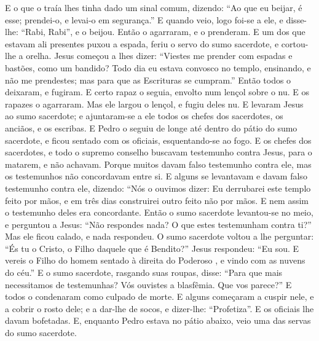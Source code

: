 {  E o que o traía lhes tinha dado um sinal comum, dizendo: “Ao que eu beijar, é esse; prendei-o, e levai-o em segurança.”
  E quando veio, logo foi-se a ele, e disse-lhe: “Rabi, Rabi”, e o beijou.
  Então o agarraram,
 e o prenderam.
  E um dos que estavam ali presentes puxou a espada, feriu o servo do sumo sacerdote, e cortou-lhe a orelha.
  Jesus começou a lhes dizer: “Viestes me prender com espadas e bastões, como
{} um bandido?
  Todo dia eu estava convosco no templo, ensinando, e não me prendestes; mas
{} para que as Escrituras se cumpram.”
  Então todos o deixaram, e fugiram.
  E certo rapaz o seguia, envolto num lençol sobre o
{} nu. E os rapazes o agarraram.
  Mas ele largou o lençol, e fugiu deles nu.
  E levaram Jesus ao sumo sacerdote; e ajuntaram-se a ele todos os chefes dos sacerdotes, os anciãos, e os escribas.
  E Pedro o seguiu de longe até dentro do pátio do sumo sacerdote, e ficou sentado com os oficiais, esquentando-se ao fogo.
  E os chefes dos sacerdotes, e todo o supremo conselho
 buscavam
{} testemunho contra Jesus, para o matarem, e não
{} achavam.
  Porque muitos davam falso testemunho contra ele, mas os testemunhos não concordavam entre si.
  E alguns se levantavam e davam falso testemunho contra ele, dizendo:
  “Nós o ouvimos dizer: Eu derrubarei este templo feito por mãos, e em três dias construirei outro feito não por mãos.
  E nem assim o testemunho deles era concordante.
  Então o sumo sacerdote levantou-se no meio, e perguntou a Jesus: “Não respondes nada? O que estes testemunham contra ti?”
  Mas ele ficou calado, e nada respondeu. O sumo sacerdote voltou a lhe perguntar: “És tu o Cristo, o Filho daquele que é Bendito?”
  Jesus respondeu: “Eu sou. E vereis o Filho do homem sentado à direita do Poderoso
,  e vindo com as nuvens do céu.”
  E o sumo sacerdote, rasgando suas roupas, disse: “Para que mais necessitamos de testemunhas?
  Vós ouvistes a blasfêmia. Que vos parece?” E todos o condenaram como culpado de morte.
  E alguns começaram a cuspir nele, e a cobrir o rosto dele; e a dar-lhe de socos, e dizer-lhe: “Profetiza”. E os oficiais lhe davam bofetadas.
  E, enquanto Pedro estava no pátio abaixo, veio uma das servas do sumo sacerdote.
}
